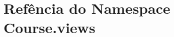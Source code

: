 \hypertarget{namespaceCourse_1_1views}{\section{Refência do Namespace Course.\-views}
\label{d3/da9/namespaceCourse_1_1views}
}
